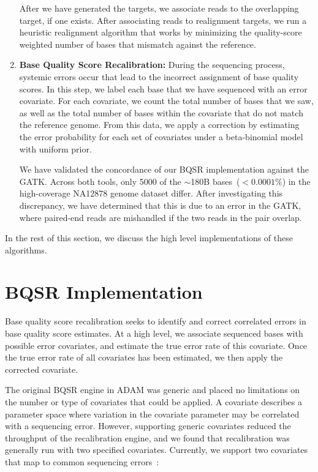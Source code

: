 \documentclass[phd]{ucbthesis}
\begin{document}
\begin{enumerate}
After we have generated the targets, we associate reads to the overlapping target, if one exists. After
associating reads to realignment targets, we run a heuristic realignment algorithm that works by minimizing
the quality-score weighted number of bases that mismatch against the reference.
\item \textbf{Base Quality Score Recalibration:} During the sequencing process, systemic errors occur
that lead to the incorrect assignment of base quality scores. In this step, we label each base that we have
sequenced with an error covariate. For each covariate, we count the total number of bases that we saw,
as well as the total number of bases within the covariate that do not match the reference genome. From this data, 
we apply a correction by estimating the error probability for each set of covariates under a beta-binomial model
with uniform prior.

We have validated the concordance of our BQSR implementation against the GATK. Across both tools, only 5000
of the $\sim$180B bases~($<0.0001\%$) in the high-coverage NA12878 genome dataset differ. After investigating
this discrepancy, we have determined that this is due to an error in the GATK, where paired-end reads are
mishandled if the two reads in the pair overlap.
\end{enumerate}

In the rest of this section, we discuss the high level implementations of these algorithms.

\section{BQSR Implementation}
\label{sec:bqsr-implementation}

Base quality score recalibration seeks to identify and correct correlated errors in base quality score estimates.
At a high level, we associate sequenced bases with possible error covariates, and estimate the
true error rate of this covariate. Once the true error rate of all covariates has been estimated, we then apply
the corrected covariate.

The original BQSR engine in {ADAM} was generic and placed
no limitations on the number or type of covariates that could be applied. A
covariate describes a parameter space where variation in the covariate parameter
may be correlated with a sequencing error. However, supporting generic covariates
reduced the throughput of the recalibration engine, and we found that
recalibration was generally run with two specified covariates. Currently, we
support two covariates that map to common sequencing errors~\cite{nakamura11}:
\end{document}
